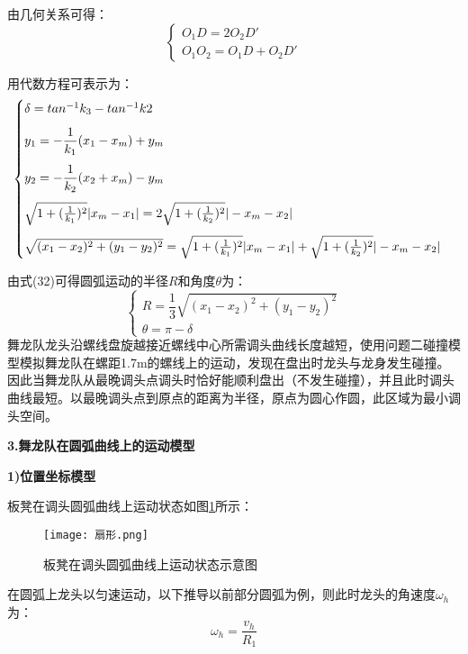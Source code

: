 \documentclass[withoutpreface,bwprint]{cumcmthesis} %
\begin{document}
	由几何关系可得：
	\begin{equation}
		\begin{cases}
		O_1 D=2O_2D'\\
		O_1O_2=O_1D+O_2D'
		\end{cases}
	\end{equation}
	
	用代数方程可表示为：
	\begin{equation}
	\begin{cases}
		\vspace{\topsep}
		\delta=tan^{-1}k_3-tan^{-1}k2\\
		\vspace{\topsep}
			y_1=-\dfrac{1}{k_1}(x_1-x_m)+y_m \\
			\vspace{\topsep}
			y_2=-\dfrac{1}{k_2}(x_2+x_m)-y_m \\
			\vspace{\topsep}
		\sqrt{1+(\frac{1}{k_1})^2}|x_m-x_1|=2\sqrt{1+(\frac{1}{k_2})^2}|-x_m-x_2|\\
		\sqrt{(x_1-x_2)^2+(y_1-y_2)^2}=\sqrt{1+(\frac{1}{k_1})^2}|x_m-x_1|+\sqrt{1+(\frac{1}{k_2})^2 }|-x_m-x_2 |
		\end{cases}
	\end{equation}

	由式(32)可得圆弧运动的半径$R$和角度$\theta$为：
	\begin{equation}
		\begin{cases}
			R=\dfrac{1}{3}\sqrt{(x_1-x_2)^2+(y_1-y_2)^2}\\
			\theta=\pi-\delta
		\end{cases}
	\end{equation}
	舞龙队龙头沿螺线盘旋越接近螺线中心所需调头曲线长度越短，使用问题二碰撞模型模拟舞龙队在螺距1.7m的螺线上的运动，发现在盘出时龙头与龙身发生碰撞。因此当舞龙队从最晚调头点调头时恰好能顺利盘出（不发生碰撞），并且此时调头曲线最短。以最晚调头点到原点的距离为半径，原点为圆心作圆，此区域为最小调头空间。
	
	\textbf{3.舞龙队在圆弧曲线上的运动模型}
	
	\textbf{1)位置坐标模型}
	
	板凳在调头圆弧曲线上运动状态如图\ref{扇形}所示：
	\begin{figure}[H]
		\centering
		\texttt{[image: 扇形.png]}
		\caption{板凳在调头圆弧曲线上运动状态示意图}
		\label{扇形}
	\end{figure}
	
	在圆弧上龙头以匀速运动，以下推导以前部分圆弧为例，则此时龙头的角速度$\omega_h$为：
	\begin{equation}
		\omega_h=\dfrac{v_h}{R_1}
	\end{equation}
	
\end{document}
